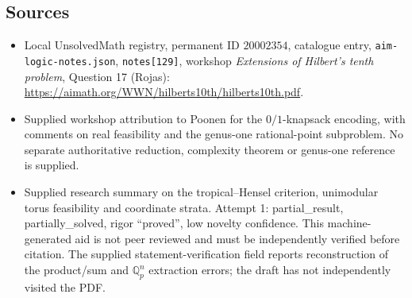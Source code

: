 \documentclass[11pt]{article}
\newcommand{\Q}{\mathbb{Q}}
\begin{document}
\subsection{Sources}
\begin{itemize}
\item Local UnsolvedMath registry, permanent ID \(20002354\), catalogue entry, \texttt{aim-logic-notes.json}, \texttt{notes[129]}, workshop \emph{Extensions of Hilbert's tenth problem}, Question 17 (Rojas): \url{https://aimath.org/WWN/hilberts10th/hilberts10th.pdf}.
\item Supplied workshop attribution to Poonen for the \(0/1\)-knapsack encoding, with comments on real feasibility and the genus-one rational-point subproblem. No separate authoritative reduction, complexity theorem or genus-one reference is supplied.
\item Supplied research summary on the tropical--Hensel criterion, unimodular torus feasibility and coordinate strata. Attempt 1: partial\_result, partially\_solved, rigor ``proved'', low novelty confidence. This machine-generated aid is not peer reviewed and must be independently verified before citation. The supplied statement-verification field reports reconstruction of the product/sum and \(\Q_p^n\) extraction errors; the draft has not independently visited the PDF.
\end{itemize}
\end{document}
